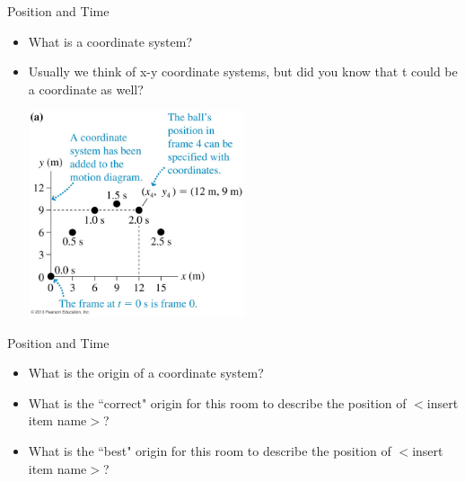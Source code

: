 \documentclass{beamer}
\begin{document}
\begin{frame}{Position and Time}
\begin{itemize}
   \item<1-> What is a coordinate system?
   \item<2-> Usually we think of x-y coordinate systems, but did you know that t could be a coordinate as well?
   \begin{center}
      \includegraphics[width=0.5\textwidth]{../figures/01_05_FigureA.jpg}
   \end{center}
\end{itemize}
\end{frame}

\begin{frame}{Position and Time}
\begin{itemize}
   \item<1-> What is the origin of a coordinate system?
   \item<2-> What is the ``correct" origin for this room to describe the position of $<$insert item name$>$?
   \item<3-> What is the ``best" origin for this room to describe the position of $<$insert item name$>$?
\end{itemize}
\end{frame}
\end{document}
